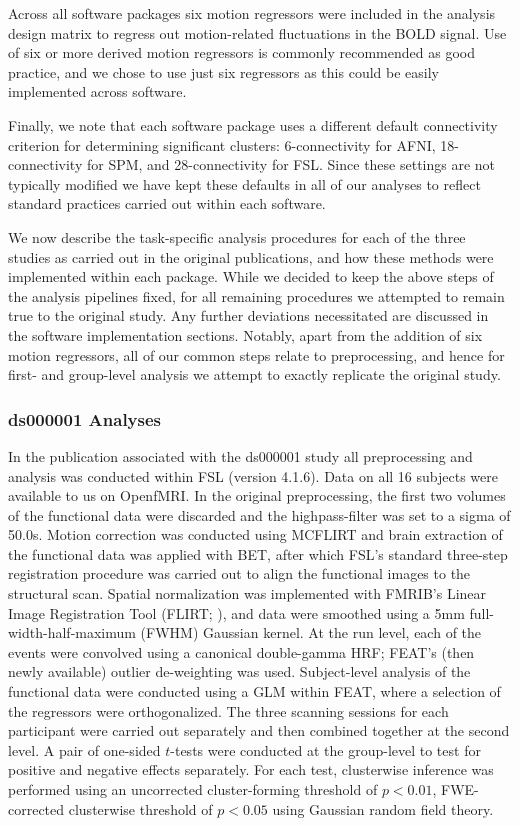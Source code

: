 Across all software packages six motion regressors were included in the analysis design matrix to regress out motion-related fluctuations in the BOLD signal. Use of six or more derived motion regressors is commonly recommended as good practice, and we chose to use just six regressors as this could be easily implemented across software. 

Finally, we note that each software package uses a different default connectivity criterion for determining significant clusters: 6-connectivity for AFNI, 18-connectivity for SPM, and 28-connectivity for FSL. Since these settings are not typically modified we have kept these defaults in all of our analyses to reflect standard practices carried out within each software. 

We now describe the task-specific analysis procedures for each of the three studies as carried out in the original publications, and how these methods were implemented within each package. While we decided to keep the above steps of the analysis pipelines fixed, for all remaining procedures we attempted to remain true to the original study. Any further deviations necessitated are discussed in the software implementation sections. Notably, apart from the addition of six motion regressors, all of our common steps relate to preprocessing, and hence for first- and group-level analysis we attempt to exactly replicate the original study. 

\subsubsection{ds000001 Analyses}
In the publication associated with the ds000001 study all preprocessing and analysis was conducted within FSL (version 4.1.6). Data on all 16 subjects were available to us on OpenfMRI. In the original preprocessing, the first two volumes of the functional data were discarded and the highpass-filter was set to a sigma of 50.0s. Motion correction was conducted using MCFLIRT and brain extraction of the functional data was applied with BET, after which FSL's standard three-step registration procedure was carried out to align the functional images to the structural scan. Spatial normalization was implemented with FMRIB's Linear Image Registration Tool (FLIRT; \citep{Jenkinson2002-qf}), and data were smoothed using a 5mm full-width-half-maximum (FWHM) Gaussian kernel. At the run level, each of the events were convolved using a canonical double-gamma HRF; FEAT's (then newly available) outlier de-weighting was used. Subject-level analysis of the functional data were conducted using a GLM within FEAT, where a selection of the regressors were orthogonalized. The three scanning sessions for each participant were carried out separately and then combined together at the second level. A pair of one-sided $t$-tests were conducted at the group-level to test for positive and negative effects separately. For each test, clusterwise inference was performed using an uncorrected cluster-forming threshold of $p < 0.01$, FWE-corrected clusterwise threshold of $p < 0.05$ using Gaussian random field theory.

